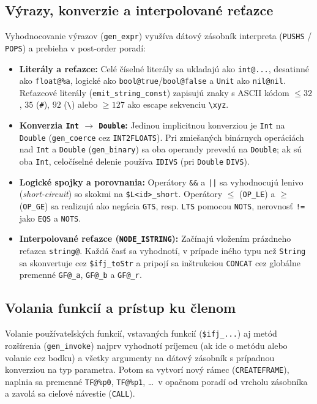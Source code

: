 \subsection{Výrazy, konverzie a interpolované reťazce}
Vyhodnocovanie výrazov (\texttt{gen\_expr}) využíva dátový zásobník interpreta (\texttt{PUSHS} / \texttt{POPS}) a prebieha v post-order poradí:
\begin{itemize}
    \item \textbf{Literály a reťazce:} Celé číselné literály sa ukladajú ako \texttt{int@...}, desatinné ako \texttt{float@\%a}, logické ako \texttt{bool@true}/\texttt{bool@false} a \texttt{Unit} ako \texttt{nil@nil}. Reťazcové literály (\texttt{emit\_string\_const}) zapisujú znaky s ASCII kódom $\le 32$, $35$ (\texttt{\#}), $92$ (\texttt{\textbackslash{}}) alebo $\ge 127$ ako escape sekvenciu \texttt{\textbackslash{}xyz}.
    \item \textbf{Konverzia \texttt{Int} $\rightarrow$ \texttt{Double}:} Jedinou implicitnou konverziou je \texttt{Int} na \texttt{Double} (\texttt{gen\_coerce} cez \texttt{INT2FLOATS}). Pri zmiešaných binárnych operáciách nad \texttt{Int} a \texttt{Double} (\texttt{gen\_binary}) sa oba operandy prevedú na \texttt{Double}; ak sú oba \texttt{Int}, celočíselné delenie používa \texttt{IDIVS} (pri \texttt{Double} \texttt{DIVS}).
    \item \textbf{Logické spojky a porovnania:} Operátory \texttt{\&\&} a \texttt{||} sa vyhodnocujú lenivo (\emph{short-circuit}) so skokmi na \texttt{\$L<id>\_short}. Operátory $\le$ (\texttt{OP\_LE}) a $\ge$ (\texttt{OP\_GE}) sa realizujú ako negácia \texttt{GTS}, resp. \texttt{LTS} pomocou \texttt{NOTS}, nerovnosť \texttt{!=} jako \texttt{EQS} a \texttt{NOTS}.
    \item \textbf{Interpolované reťazce (\texttt{NODE\_ISTRING}):} Začínajú vložením prázdneho reťazca \texttt{string@}. Každá časť sa vyhodnotí, v prípade iného typu než \texttt{String} sa skonvertuje cez \texttt{\$ifj\_toStr} a pripojí sa inštrukciou \texttt{CONCAT} cez globálne premenné \texttt{GF@\_a}, \texttt{GF@\_b} a \texttt{GF@\_r}.
\end{itemize}

\subsection{Volania funkcií a prístup ku členom}
Volanie používateľských funkcií, vstavaných funkcií (\texttt{\$ifj\_...}) aj metód rozšírenia (\texttt{gen\_invoke}) najprv vyhodnotí príjemcu (ak ide o metódu alebo volanie cez bodku) a všetky argumenty na dátový zásobník s prípadnou konverziou na typ parametra. Potom sa vytvorí nový rámec (\texttt{CREATEFRAME}), naplnia sa premenné \texttt{TF@\%p0}, \texttt{TF@\%p1}, \dots\ v opačnom poradí od vrcholu zásobníka a zavolá sa cieľové návestie (\texttt{CALL}).

